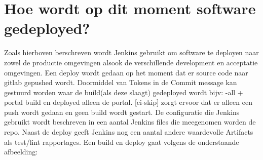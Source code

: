 \section{Hoe wordt op dit moment software gedeployed?}\label{sec:hoe-wordt-op-dit-moment-software-gedeployed?}
Zoals hierboven berschreven wordt Jenkins gebruikt om software te deployen naar zowel de productie omgevingen alsook de verschillende development en acceptatie omgevingen.
Een deploy wordt gedaan op het moment dat er source code naar gitlab gepushed wordt.
Doormiddel van Tokens in de Commit message kan gestuurd worden waar de build(als deze slaagt) gedeployed wordt bijv: {-all + portal} build en deployed alleen de portal. [ci-skip] zorgt ervoor dat er alleen een push wordt gedaan en geen build wordt gestart.
De configuratie die Jenkins gebruikt wordt beschreven in een aantal Jenkins files die meegenomen worden de repo.
Naast de deploy geeft Jenkins nog een aantal andere waardevolle Artifacts als test/lint rapportages.
Een build en deploy gaat volgens de onderstaande afbeelding:

